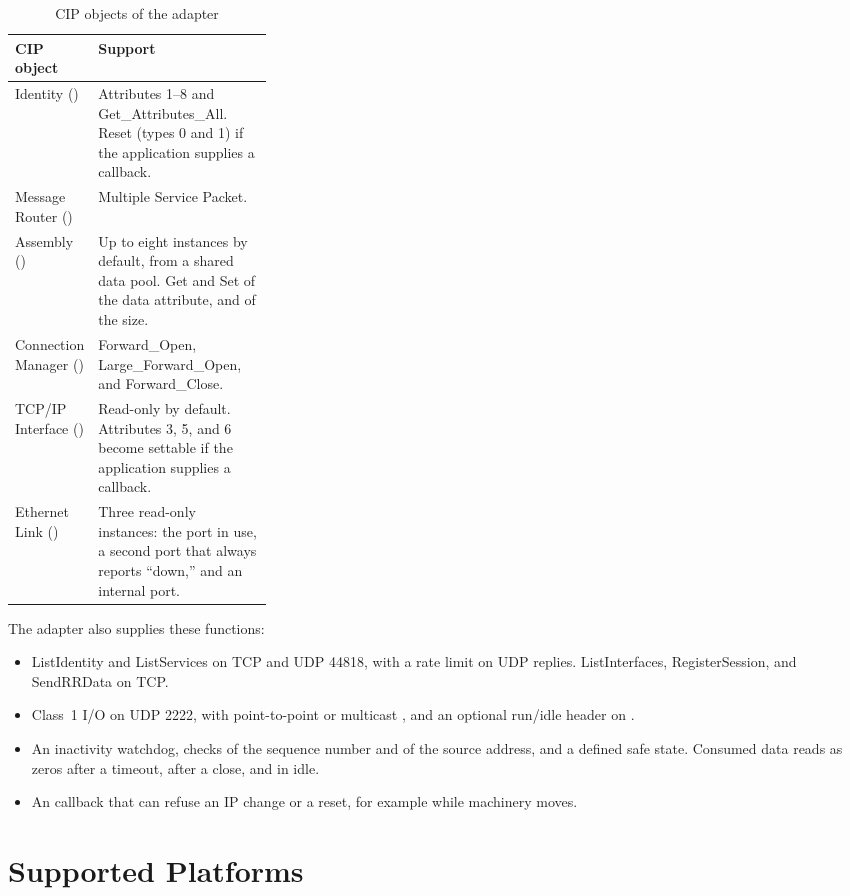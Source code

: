 \begin{table}[htbp]
\centering
\caption{CIP objects of the adapter}\label{tab:adapter-objects}
\begin{tabularx}{\linewidth}{@{}P{0.30\linewidth}L@{}}
\toprule
\textbf{CIP object} & \textbf{Support} \\
\midrule
Identity () & Attributes 1--8 and Get\_Attributes\_All. Reset
(types 0 and 1) if the application supplies a callback. \\
Message Router () & Multiple Service Packet. \\
Assembly () & Up to eight instances by default, from a shared data
pool. Get and Set of the data attribute, and of the size. \\
Connection Manager () & Forward\_Open, Large\_Forward\_Open, and
Forward\_Close. \\
TCP/IP Interface () & Read-only by default. Attributes 3, 5, and 6
become settable if the application supplies a callback. \\
Ethernet Link () & Three read-only instances: the port in use, a
second port that always reports ``down,'' and an internal port. \\
\bottomrule
\end{tabularx}
\end{table}

The adapter also supplies these functions:

\begin{itemize}
  \item ListIdentity and ListServices on TCP and UDP 44818, with a rate
        limit on UDP replies. ListInterfaces, RegisterSession, and SendRRData
        on TCP.
  \item Class~1 I/O on UDP 2222, with point-to-point or multicast \TO, and an
        optional run/idle header on \OT.
  \item An inactivity watchdog, checks of the sequence number and of the
        source address, and a defined safe state. Consumed data reads as zeros
        after a timeout, after a close, and in idle.
  \item An  callback that can refuse an IP change or a
        reset, for example while machinery moves.
\end{itemize}

\section{Supported Platforms}\label{sec:platforms-summary}

